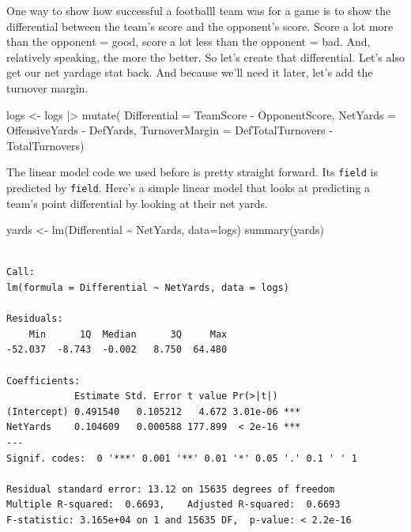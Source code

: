 \documentclass[
  letterpaper,
  DIV=11,
  numbers=noendperiod]{scrreprt}
\newenvironment{Shaded}{\begin{snugshade}}{\end{snugshade}}
\newcommand{\AttributeTok}[1]{\textcolor[rgb]{0.40,0.45,0.13}{#1}}
\newcommand{\FunctionTok}[1]{\textcolor[rgb]{0.28,0.35,0.67}{#1}}
\newcommand{\NormalTok}[1]{\textcolor[rgb]{0.00,0.23,0.31}{#1}}
\newcommand{\OtherTok}[1]{\textcolor[rgb]{0.00,0.23,0.31}{#1}}
\newcommand{\SpecialCharTok}[1]{\textcolor[rgb]{0.37,0.37,0.37}{#1}}
\begin{document}
One way to show how successful a footballl team was for a game is to
show the differential between the team's score and the opponent's score.
Score a lot more than the opponent = good, score a lot less than the
opponent = bad. And, relatively speaking, the more the better. So let's
create that differential. Let's also get our net yardage stat back. And
because we'll need it later, let's add the turnover margin.

\begin{Shaded}
\begin{Highlighting}[]
\NormalTok{logs }\OtherTok{\textless{}{-}}\NormalTok{ logs }\SpecialCharTok{|\textgreater{}} \FunctionTok{mutate}\NormalTok{(}
  \AttributeTok{Differential =}\NormalTok{ TeamScore }\SpecialCharTok{{-}}\NormalTok{ OpponentScore, }
  \AttributeTok{NetYards =}\NormalTok{ OffensiveYards }\SpecialCharTok{{-}}\NormalTok{ DefYards, }
  \AttributeTok{TurnoverMargin =}\NormalTok{ DefTotalTurnovers }\SpecialCharTok{{-}}\NormalTok{ TotalTurnovers)}
\end{Highlighting}
\end{Shaded}

The linear model code we used before is pretty straight forward. Its
\texttt{field} is predicted by \texttt{field}. Here's a simple linear
model that looks at predicting a team's point differential by looking at
their net yards.

\begin{Shaded}
\begin{Highlighting}[]
\NormalTok{yards }\OtherTok{\textless{}{-}} \FunctionTok{lm}\NormalTok{(Differential }\SpecialCharTok{\textasciitilde{}}\NormalTok{ NetYards, }\AttributeTok{data=}\NormalTok{logs)}
\FunctionTok{summary}\NormalTok{(yards)}
\end{Highlighting}
\end{Shaded}

\begin{verbatim}

Call:
lm(formula = Differential ~ NetYards, data = logs)

Residuals:
    Min      1Q  Median      3Q     Max 
-52.037  -8.743  -0.002   8.750  64.480 

Coefficients:
            Estimate Std. Error t value Pr(>|t|)    
(Intercept) 0.491540   0.105212   4.672 3.01e-06 ***
NetYards    0.104609   0.000588 177.899  < 2e-16 ***
---
Signif. codes:  0 '***' 0.001 '**' 0.01 '*' 0.05 '.' 0.1 ' ' 1

Residual standard error: 13.12 on 15635 degrees of freedom
Multiple R-squared:  0.6693,    Adjusted R-squared:  0.6693 
F-statistic: 3.165e+04 on 1 and 15635 DF,  p-value: < 2.2e-16
\end{verbatim}
\end{document}
